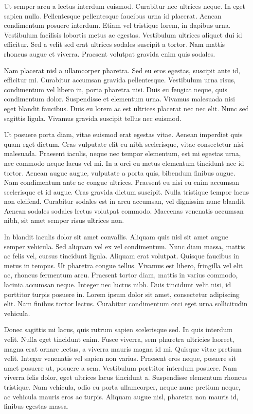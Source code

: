 Ut semper arcu a lectus interdum euismod. Curabitur nec ultrices neque. In eget sapien nulla. Pellentesque pellentesque faucibus urna id placerat. Aenean condimentum posuere interdum. Etiam vel tristique lorem, in dapibus urna. Vestibulum facilisis lobortis metus ac egestas. Vestibulum ultrices aliquet dui id efficitur. Sed a velit sed erat ultrices sodales suscipit a tortor. Nam mattis rhoncus augue et viverra. Praesent volutpat gravida enim quis sodales.

Nam placerat nisl a ullamcorper pharetra. Sed eu eros egestas, suscipit ante id, efficitur mi. Curabitur accumsan gravida pellentesque. Vestibulum urna risus, condimentum vel libero in, porta pharetra nisi. Duis eu feugiat neque, quis condimentum dolor. Suspendisse et elementum urna. Vivamus malesuada nisi eget blandit faucibus. Duis eu lorem ac est ultrices placerat nec nec elit. Nunc sed sagittis ligula. Vivamus gravida suscipit tellus nec euismod.

Ut posuere porta diam, vitae euismod erat egestas vitae. Aenean imperdiet quis quam eget dictum. Cras vulputate elit eu nibh scelerisque, vitae consectetur nisi malesuada. Praesent iaculis, neque nec tempor elementum, est mi egestas urna, nec commodo neque lacus vel mi. In a orci eu metus elementum tincidunt nec id tortor. Aenean augue augue, vulputate a porta quis, bibendum finibus augue. Nam condimentum ante ac congue ultrices. Praesent eu nisi eu enim accumsan scelerisque et id augue. Cras gravida dictum suscipit. Nulla tristique tempor lacus non eleifend. Curabitur sodales est in arcu accumsan, vel dignissim nunc blandit. Aenean sodales sodales lectus volutpat commodo. Maecenas venenatis accumsan nibh, sit amet semper risus ultrices non.

In blandit iaculis dolor sit amet convallis. Aliquam quis nisl sit amet augue semper vehicula. Sed aliquam vel ex vel condimentum. Nunc diam massa, mattis ac felis vel, cursus tincidunt ligula. Aliquam erat volutpat. Quisque faucibus in metus in tempus. Ut pharetra congue tellus. Vivamus est libero, fringilla vel elit ac, rhoncus fermentum arcu. Praesent tortor diam, mattis in varius commodo, lacinia accumsan neque. Integer nec luctus nibh. Duis tincidunt velit nisi, id porttitor turpis posuere in. Lorem ipsum dolor sit amet, consectetur adipiscing elit. Nam finibus tortor lectus. Curabitur condimentum orci eget urna sollicitudin vehicula.

Donec sagittis mi lacus, quis rutrum sapien scelerisque sed. In quis interdum velit. Nulla eget tincidunt enim. Fusce viverra, sem pharetra ultricies laoreet, magna erat ornare lectus, a viverra mauris magna id mi. Quisque vitae pretium velit. Integer venenatis vel sapien non varius. Praesent eros neque, posuere sit amet posuere ut, posuere a sem. Vestibulum porttitor interdum posuere. Nam viverra felis dolor, eget ultrices lacus tincidunt a. Suspendisse elementum rhoncus tristique. Nam vehicula, odio eu porta ullamcorper, neque nunc pretium neque, ac vehicula mauris eros ac turpis. Aliquam augue nisl, pharetra non mauris id, finibus egestas massa.

